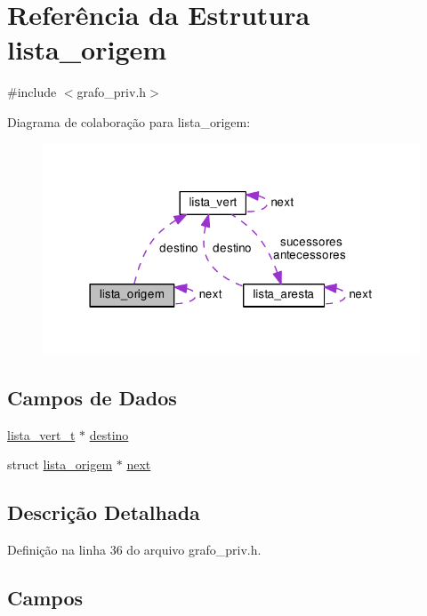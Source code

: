 \hypertarget{structlista__origem}{}\section{Referência da Estrutura lista\+\_\+origem}
\label{structlista__origem}


{\ttfamily \#include $<$grafo\+\_\+priv.\+h$>$}



Diagrama de colaboração para lista\+\_\+origem\+:\nopagebreak
\begin{figure}[H]
\begin{center}
\leavevmode
\includegraphics[width=318pt]{structlista__origem__coll__graph}
\end{center}
\end{figure}
\subsection*{Campos de Dados}
\begin{DoxyCompactItemize}
\item 
\hyperlink{grafo__priv_8h_aecb68281fecb412bf6427dd6a07d5077}{lista\+\_\+vert\+\_\+t} $\ast$ \hyperlink{structlista__origem_a2634ade77a03658b5cbc02e44d3e784f}{destino}
\item 
struct \hyperlink{structlista__origem}{lista\+\_\+origem} $\ast$ \hyperlink{structlista__origem_a3d90d523832090d0a99ee45025c95c03}{next}
\end{DoxyCompactItemize}


\subsection{Descrição Detalhada}


Definição na linha 36 do arquivo grafo\+\_\+priv.\+h.



\subsection{Campos}
\hypertarget{structlista__origem_a2634ade77a03658b5cbc02e44d3e784f}{}
